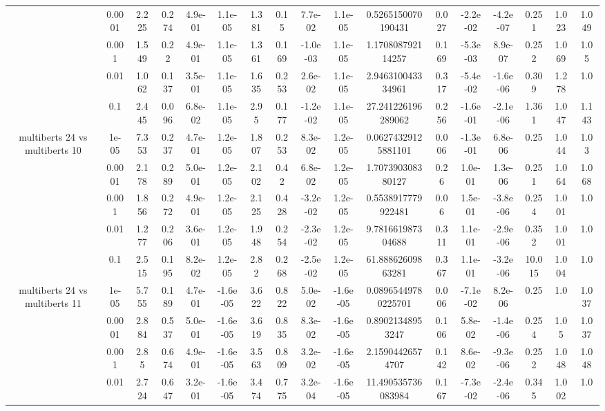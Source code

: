 \begin{tabular}{|c|c|c|c|c|c|c|c|c|c|c|c|c|c|c|c|c|}
 & 0.0001 & 2.225 & 0.274 & 4.9e-01 & 1.1e-05 & 1.381 & 0.15 & 7.7e-02 & 1.1e-05 & 0.5265150070190431 & 0.027 & -2.2e-02 & -4.2e-07 & 0.251 & 1.023 & 1.049 \\
 & 0.001 & 1.549 & 0.22 & 4.9e-01 & 1.1e-05 & 1.361 & 0.169 & -1.0e-03 & 1.1e-05 & 1.170808792114257 & 0.169 & -5.3e-03 & 8.9e-07 & 0.252 & 1.069 & 1.05 \\
 & 0.01 & 1.062 & 0.137 & 3.5e-01 & 1.1e-05 & 1.635 & 0.253 & 2.6e-02 & 1.1e-05 & 2.946310043334961 & 0.317 & -5.4e-02 & -1.6e-06 & 0.309 & 1.278 & 1.0 \\
 & 0.1 & 2.445 & 0.096 & 6.8e-02 & 1.1e-05 & 2.95 & 0.177 & -1.2e-02 & 1.1e-05 & 27.241226196289062 & 0.256 & -1.6e-01 & -2.1e-06 & 1.361 & 1.047 & 1.143 \\
\hline
\multirow{5}{*}{multiberts 24 vs multiberts 10} & 1e-05 & 7.353 & 0.237 & 4.7e-01 & 1.2e-05 & 1.807 & 0.253 & 8.3e-02 & 1.2e-05 & 0.06274329125881101 & 0.006 & -1.3e-01 & 6.8e-06 & 0.25 & 1.044 & 1.03 \\
 & 0.0001 & 2.178 & 0.289 & 5.0e-01 & 1.2e-05 & 2.102 & 0.42 & 6.8e-02 & 1.2e-05 & 1.707390308380127 & 0.26 & 1.0e-01 & 1.3e-06 & 0.251 & 1.064 & 1.068 \\
 & 0.001 & 1.856 & 0.272 & 4.9e-01 & 1.2e-05 & 2.125 & 0.428 & -3.2e-02 & 1.2e-05 & 0.5538917779922481 & 0.06 & 1.5e-01 & -3.8e-06 & 0.254 & 1.001 & 1.0 \\
 & 0.01 & 1.277 & 0.206 & 3.6e-01 & 1.2e-05 & 1.948 & 0.254 & -2.3e-02 & 1.2e-05 & 9.781661987304688 & 0.311 & 1.1e-01 & -2.9e-06 & 0.352 & 1.001 & 1.0 \\
 & 0.1 & 2.515 & 0.195 & 8.2e-02 & 1.2e-05 & 2.82 & 0.268 & -2.5e-02 & 1.2e-05 & 61.88862609863281 & 0.367 & 1.1e-01 & -3.2e-06 & 10.015 & 1.004 & 1.0 \\
\hline
\multirow{5}{*}{multiberts 24 vs multiberts 11} & 1e-05 & 5.755 & 0.189 & 4.7e-01 & -1.6e-05 & 3.622 & 0.822 & 5.0e-02 & -1.6e-05 & 0.08965449780225701 & 0.006 & -7.1e-02 & 8.2e-06 & 0.25 & 1.0 & 1.037 \\
 & 0.0001 & 2.884 & 0.537 & 5.0e-01 & -1.6e-05 & 3.619 & 0.835 & 8.3e-02 & -1.6e-05 & 0.89021348953247 & 0.106 & 5.8e-02 & -1.4e-06 & 0.254 & 1.05 & 1.037 \\
 & 0.001 & 2.85 & 0.674 & 4.9e-01 & -1.6e-05 & 3.563 & 0.809 & 3.2e-02 & -1.6e-05 & 2.15904426574707 & 0.142 & 8.6e-02 & -9.3e-06 & 0.252 & 1.048 & 1.048 \\
 & 0.01 & 2.724 & 0.647 & 3.2e-01 & -1.6e-05 & 3.474 & 0.775 & 3.2e-04 & -1.6e-05 & 11.490535736083984 & 0.167 & -7.3e-02 & -2.4e-06 & 0.345 & 1.002 & 1.0 \\

\end{tabular}
